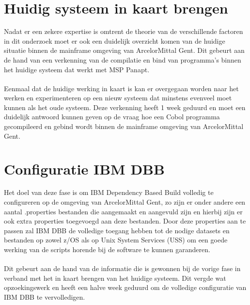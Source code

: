\section{Huidig systeem in kaart brengen}
\label{sec:huidig systeem}
Nadat er een zekere expertise is omtrent de theorie van de verschillende factoren in dit onderzoek moet er ook een duidelijk overzicht komen van de huidige situatie binnen de mainframe omgeving van ArcelorMittal Gent. Dit gebeurt aan de hand van een verkenning van de compilatie en bind van programma's binnen het huidige systeem dat werkt met MSP Panapt. 
\\ \\ 
Eenmaal dat de huidige werking in kaart is kan er overgegaan worden naar het werken en experimenteren op een nieuw systeem dat minstens evenveel moet kunnen als het oude systeem. Deze verkenning heeft 1 week geduurd en moet een duidelijk antwoord kunnen geven op de vraag hoe een Cobol programma gecompileerd en gebind wordt binnen de mainframe omgeving van ArcelorMittal Gent. 

\section{Configuratie IBM DBB}
\label{sec:configuratie dbb}
Het doel van deze fase is om IBM Dependency Based Build volledig te configureren op de omgeving van ArcelorMittal Gent,
zo zijn er onder andere een aantal .properties bestanden die aangemaakt en aangevuld zijn en hierbij zijn er ook extra properties toegevoegd aan deze bestanden.
Door deze properties aan te passen zal IBM DBB de volledige toegang hebben tot de nodige datasets en bestanden op zowel z/OS als op Unix System Services (USS) om een goede werking van de scripts horende bij de software te kunnen garanderen. 
\\ \\
Dit gebeurt aan de hand van de informatie die is gewonnen bij de vorige fase in verband met het in kaart brengen van het huidige systeem. Dit vergde wat opzoekingswerk en heeft een halve week geduurd om de volledige configuratie van IBM DBB te vervolledigen.

